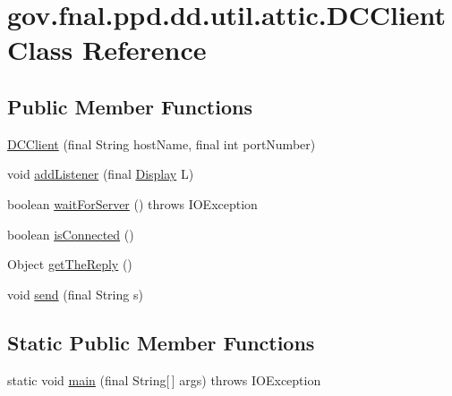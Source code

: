 \hypertarget{classgov_1_1fnal_1_1ppd_1_1dd_1_1util_1_1attic_1_1DCClient}{\section{gov.\-fnal.\-ppd.\-dd.\-util.\-attic.\-D\-C\-Client Class Reference}
\label{classgov_1_1fnal_1_1ppd_1_1dd_1_1util_1_1attic_1_1DCClient}
}
\subsection*{Public Member Functions}
\begin{DoxyCompactItemize}
\item 
\hyperlink{classgov_1_1fnal_1_1ppd_1_1dd_1_1util_1_1attic_1_1DCClient_a5d71cb09bf8cf29761f32f75059eec0f}{D\-C\-Client} (final String host\-Name, final int port\-Number)
\item 
void \hyperlink{classgov_1_1fnal_1_1ppd_1_1dd_1_1util_1_1attic_1_1DCClient_a1b200055fcecffdf05438c1cd53fa904}{add\-Listener} (final \hyperlink{interfacegov_1_1fnal_1_1ppd_1_1dd_1_1signage_1_1Display}{Display} L)
\item 
boolean \hyperlink{classgov_1_1fnal_1_1ppd_1_1dd_1_1util_1_1attic_1_1DCClient_a603901dcfbf3a3b03b9909802dbec036}{wait\-For\-Server} ()  throws I\-O\-Exception 
\item 
boolean \hyperlink{classgov_1_1fnal_1_1ppd_1_1dd_1_1util_1_1attic_1_1DCClient_a87c3040ca2636ba9b4fb3b9993c43d5e}{is\-Connected} ()
\item 
Object \hyperlink{classgov_1_1fnal_1_1ppd_1_1dd_1_1util_1_1attic_1_1DCClient_affb9fbd1d4537e5d5146b088cb4d25e6}{get\-The\-Reply} ()
\item 
void \hyperlink{classgov_1_1fnal_1_1ppd_1_1dd_1_1util_1_1attic_1_1DCClient_ac75e59bff65801ed35f5186606b8aa53}{send} (final String s)
\end{DoxyCompactItemize}
\subsection*{Static Public Member Functions}
\begin{DoxyCompactItemize}
\item 
static void \hyperlink{classgov_1_1fnal_1_1ppd_1_1dd_1_1util_1_1attic_1_1DCClient_a45f6476f853d4471000afd7ef2060739}{main} (final String\mbox{[}$\,$\mbox{]} args)  throws I\-O\-Exception 
\end{DoxyCompactItemize}


